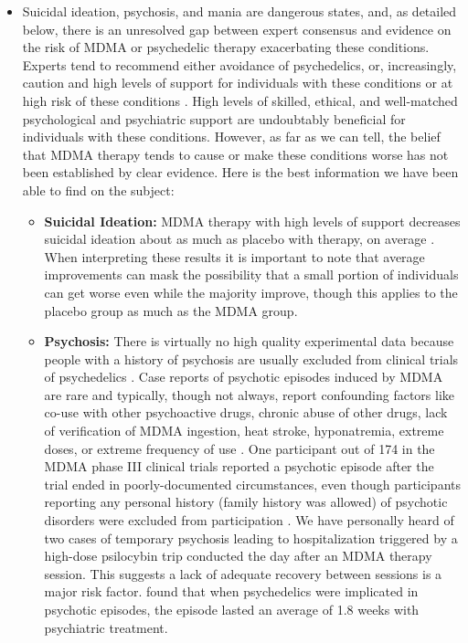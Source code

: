 \documentclass[12pt,letterpaper]{book}
\begin{document}
\begin{itemize}
    \item Suicidal ideation, psychosis, and mania are dangerous states, and, as detailed below, there is an unresolved gap between expert consensus and evidence on the risk of MDMA or psychedelic therapy exacerbating these conditions. Experts tend to recommend either avoidance of psychedelics, or, increasingly, caution and high levels of support for individuals with these conditions or at high risk of these conditions \cite{la2022Psychosis}. High levels of skilled, ethical, and well-matched psychological and psychiatric support are undoubtably beneficial for individuals with these conditions. However, as far as we can tell, the belief that MDMA therapy tends to cause or make these conditions worse has not been established by clear evidence. Here is the best information we have been able to find on the subject:
        \begin{itemize}
            \item \textbf{Suicidal Ideation:} MDMA therapy with high levels of support decreases suicidal ideation about as much as placebo with therapy, on average \cite{mitchellMDMAClinicalTrial,mitchellMDMAClinicalTrial2}. When interpreting these results it is important to note that average improvements can mask the possibility that a small portion of individuals can get worse even while the majority improve, though this applies to the placebo group as much as the MDMA group.
            \item \textbf{Psychosis:} There is virtually no high quality experimental data because people with a history of psychosis are usually excluded from clinical trials of psychedelics \cite{la2022Psychosis}. Case reports of psychotic episodes induced by MDMA are rare and typically, though not always, report confounding factors like co-use with other psychoactive drugs, chronic abuse of other drugs, lack of verification of MDMA ingestion, heat stroke, hyponatremia, extreme doses, or extreme frequency of use \cite{psychosisTreatment,arnovitzSchizophrenia,mcguirePsychosis,patelPsychosis,vaivaPsychosis}. One participant out of 174 in the MDMA phase III clinical trials reported a psychotic episode after the trial ended in poorly-documented circumstances, even though participants reporting any personal history (family history was allowed) of psychotic disorders were excluded from participation \cite{powerTrip,smithSystematic,mitchellMDMAClinicalTrial2}. We have personally heard of two cases of temporary psychosis leading to hospitalization triggered by a high-dose psilocybin trip conducted the day after an MDMA therapy session. This suggests a lack of adequate recovery between sessions is a major risk factor. \textcite{psychosisTreatment} found that when psychedelics were implicated in psychotic episodes, the episode lasted an average of 1.8 weeks with psychiatric treatment.

\end{itemize}
\end{itemize}
\end{document}
